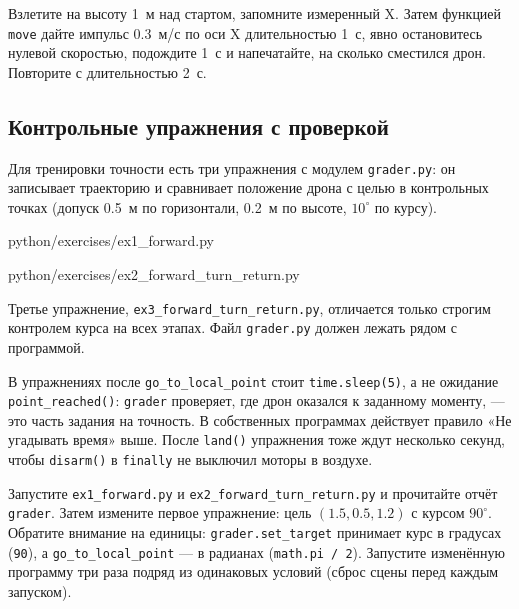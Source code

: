 \begin{taskbox}
Взлетите на высоту 1~м над стартом, запомните измеренный X. Затем функцией \verb|move| дайте импульс 0.3~м/с по оси X длительностью 1~с, явно остановитесь нулевой скоростью, подождите 1~с и напечатайте, на сколько сместился дрон. Повторите с длительностью 2~с.
\end{taskbox}

\subsection{Контрольные упражнения с проверкой}

Для тренировки точности есть три упражнения с модулем \texttt{grader.py}: он записывает траекторию и сравнивает положение дрона с целью в контрольных точках (допуск 0.5~м по горизонтали, 0.2~м по высоте, $10^\circ$ по курсу).

\begin{codefile}[python]{python/exercises/ex1_forward.py}
\end{codefile}

\begin{codefile}[python]{python/exercises/ex2_forward_turn_return.py}
\end{codefile}

Третье упражнение, \texttt{ex3\_forward\_turn\_return.py}, отличается только строгим контролем курса на всех этапах. Файл \texttt{grader.py} должен лежать рядом с программой.

\begin{infobox}
В упражнениях после \verb|go_to_local_point| стоит \verb|time.sleep(5)|, а не ожидание \verb|point_reached()|: \texttt{grader} проверяет, где дрон оказался к заданному моменту, --- это часть задания на точность. В собственных программах действует правило «Не угадывать время» выше. После \verb|land()| упражнения тоже ждут несколько секунд, чтобы \verb|disarm()| в \verb|finally| не выключил моторы в воздухе.
\end{infobox}

\begin{taskbox}
Запустите \texttt{ex1\_forward.py} и \texttt{ex2\_forward\_turn\_return.py} и прочитайте отчёт \texttt{grader}. Затем измените первое упражнение: цель $(1.5, 0.5, 1.2)$ с курсом $90^\circ$. Обратите внимание на единицы: \verb|grader.set_target| принимает курс в градусах (\verb|90|), а \verb|go_to_local_point| --- в радианах (\verb|math.pi / 2|). Запустите изменённую программу три раза подряд из одинаковых условий (сброс сцены перед каждым запуском).
\end{taskbox}

